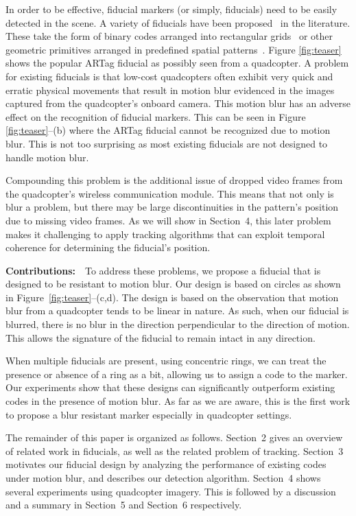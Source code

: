 \documentclass[10pt,twocolumn,letterpaper]{article}
\begin{document}
In order to be effective, fiducial markers (or simply, fiducials) need
to be easily detected in the scene. A variety of fiducials have
been proposed~\cite{NaimarkF02,ARToolkit02,Fiala05,Pitag13,runetag11}
in the literature.  These take the form of binary codes arranged into
rectangular grids~\cite{ARToolkit02,Fiala05} or other geometric
primitives arranged in predefined spatial
patterns~\cite{NaimarkF02,Pitag13,runetag11}.  Figure \ref{fig:teaser}
shows the popular ARTag \cite{Fiala05} fiducial as possibly seen from
a quadcopter. A problem for existing fiducials is that low-cost
quadcopters often exhibit very quick and erratic physical movements
that result in motion blur evidenced in the images captured from the quadcopter's onboard
camera. This motion blur has an adverse effect on the recognition of fiducial
markers. This can be seen in Figure \ref{fig:teaser}--(b) where the
ARTag fiducial cannot be recognized due to motion blur. This is not
too surprising as most existing fiducials are not designed to handle
motion blur.

Compounding this problem is the additional issue of dropped video
frames from the quadcopter's wireless communication module. This means
that not only is blur a problem, but there may be large
discontinuities in the pattern's position due to missing video
frames. As we will show in Section~4, this later problem makes it
challenging to apply tracking algorithms that can exploit temporal
coherence for determining the fiducial's position.

\noindent\textbf{Contributions:}~~To address these problems, we propose a
fiducial that is designed to be resistant to motion blur. Our design
is based on circles as shown in Figure~\ref{fig:teaser}--(c,d). The
design is based on the observation that motion blur from a quadcopter
tends to be linear in nature. As such, when our fiducial is blurred,
there is no blur in the direction perpendicular to the direction of
motion.  This allows the signature of the fiducial to remain intact in
any direction.

When multiple fiducials are present, using concentric rings, we can
treat the presence or absence of a ring as a bit, allowing us to
assign a code to the marker. Our experiments show that these designs can
significantly outperform existing codes in the presence of motion
blur. As far as we are aware, this is the first work to propose a blur
resistant marker especially in quadcopter settings.

The remainder of this paper is organized as follows.  Section~2 gives
an overview of related work in fiducials, as well as the related
problem of tracking. Section~3 motivates our fiducial design by
analyzing the performance of existing codes under motion blur, and
describes our detection algorithm. Section~4 shows several
experiments using quadcopter imagery. This is followed by a discussion
and a summary in Section~5 and Section~6 respectively.
\end{document}
